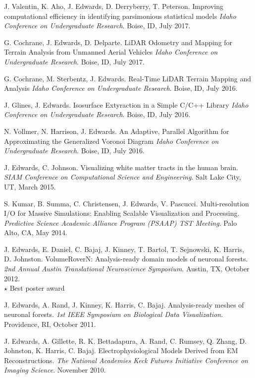 \documentclass[margin,line]{res}
\begin{document}
\begin{resume}
\begin{LONG}
J. Valentin, K. Aho, J. Edwards, D. Derryberry, T. Peterson.
Improving computational efficiency in identifying parsimonious statistical models
\textit{Idaho Conference on Undergraduate Research}. Boise, ID, July 2017.

G. Cochrane, J. Edwards, D. Delparte.
LiDAR Odometry and Mapping for Terrain Analysis from Unmanned Aerial Vehicles
\textit{Idaho Conference on Undergraduate Research}. Boise, ID, July 2017.

G. Cochrane, M. Sterbentz, J. Edwards.
Real-Time LiDAR Terrain Mapping and Analysis
\textit{Idaho Conference on Undergraduate Research}. Boise, ID, July 2016.

J. Glines, J. Edwards.
Isosurface Extyraction in a Simple C/C++ Library
\textit{Idaho Conference on Undergraduate Research}. Boise, ID, July 2016.

N. Vollmer, N. Harrison, J. Edwards.
An Adaptive, Parallel Algorithm for Approximating the Generalized Voronoi Diagram
\textit{Idaho Conference on Undergraduate Research}. Boise, ID, July 2016.

J. Edwards, C. Johnson.
Visualizing white matter tracts in the human brain.
\textit{SIAM Conference on Computational Science and Engineering}. Salt Lake City, UT, March 2015.

S. Kumar, B. Summa, C. Christensen, J. Edwards, V. Pascucci.
Multi-resolution I/O for Massive Simulations: Enabling Scalable Visualization and Processing.
\textit{Predictive Science Academic Alliance Program (PSAAP) TST Meeting}. Palo Alto, CA, May 2014.

J. Edwards, E. Daniel, C. Bajaj, J. Kinney, T. Bartol, T. Sejnowski, K. Harris, D. Johnston.
VolumeRoverN: Analysis-ready domain models of neuronal forests.
\textit{2nd Annual Austin Translational Neuroscience Symposium}. Austin, TX, October 2012. \\
$\star$ Best poster award


J. Edwards, A. Rand, J. Kinney, K. Harris, C. Bajaj. 
Analysis-ready meshes of neuronal forests. 
\textit{1st IEEE Symposium on Biological Data Visualization}. Providence, RI, October 2011.

J. Edwards, A. Gillette, R. K. Bettadapura, A. Rand, C. Rumsey, Q. Zhang, D. Johnston, K. Harris, C. Bajaj. 
Electrophysiological Models Derived from EM Reconstructions. 
\textit{The National Academies Keck Futures Initiative Conference on Imaging Science}. November 2010.


\end{LONG}
\end{resume}
\end{document}
